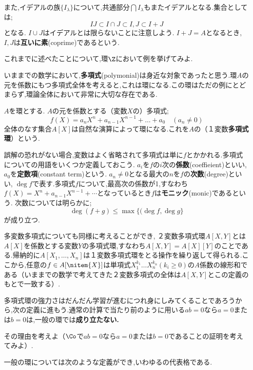 また,イデアルの族$\{I_\lambda\}$について,共通部分$\bigcap I_\lambda$もまたイデアルとなる.集合としては;
\[IJ\subset I\cap J\subset I,J\subset I+J\]
となる. $I\cup J$はイデアルとは限らないことに注意しよう. $I+J=A$となるとき, $I,J$は\textbf{互いに素}(coprime)であるという.


\begin{exer}
	これまでに述べたことについて,環$\Z$において例を挙げてみよ.
\end{exer}

いままでの数学において,\textbf{多項式}(polymonial)は身近な対象であったと思う.環$A$の元を係数にもつ多項式全体を考えると,これは環になる.この環はただの例にとどまらず,環論全体において非常に大切な存在である.

\begin{defi}[多項式環]
	$A$を環とする. $A$の元を係数とする（変数$X$の）多項式;
	\[f(X)=a_nX^n+a_{n-1}X^{n-1}+\dots+a_0\quad(a_n\neq0)\]
	全体のなす集合$A[X]$は自然な演算によって環になる.これを$A$の（１変数\textbf{多項式環}）という.
\end{defi}
誤解の恐れがない場合,変数はよく省略されて多項式は単に$f$とかかれる.多項式についての用語をいくつか定義しておこう. $a_i$を$f$の$i$次の\textbf{係数}(coeffieient)といい, $a_0$を\textbf{定数項}(constant term)という. $a_n\neq0$となる最大の$n$を$f$の\textbf{次数}(degree)といい, $\deg f$で表す.多項式$f$について,最高次の係数が1,すなわち$f(X)=X^n+a_{n-1}X^{n-1}+\cdots$となっているとき$f$は\textbf{モニック}(monic)であるという. 次数については明らかに;
\[\deg (f+g)\leq\max\{(\deg f,\deg g\}\]
が成り立つ.

多変数多項式についても同様に考えることができ, ２変数多項式環$A[X,Y]$とは$A[X]$を係数とする変数$Y$の多項式環,すなわち$A[X,Y]=A[X][Y]$のことである.帰納的に$A[X_1,\dots,X_n]$は１変数多項式環をとる操作を繰り返して得られる.ここから,任意の$f\in A[\nitem{X}]$は単項式$X_1^{k_1}\dots X_n^{k_n} (k_i\geq0)$の$A$係数の線形和である（いままでの数学で考えてきた２変数多項式の全体は$A[X,Y]$とこの定義のもとで一致する）.

多項式環の強力さはだんだん学習が進むにつれ身にしみてくることであろうから,次の定義に進もう.通常の計算で当たり前のように用いる$ab=0$なら$a=0$または$b=0$は,一般の環では\textbf{成り立たない.}

\begin{exer}
	その理由を考えよ（$\Co$で$ab=0$なら$a=0$または$b=0$であることの証明を考えてみよ）.
\end{exer}

一般の環については次のような定義ができ,いわゆるの代表格である.

